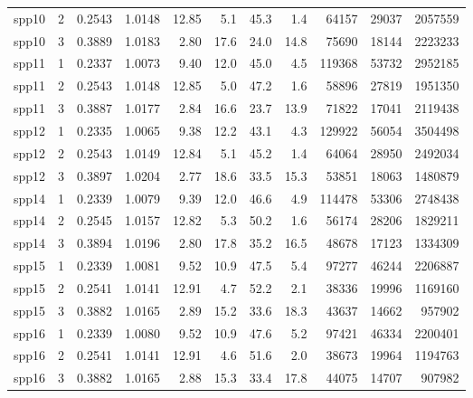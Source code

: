 \documentclass[12pt, a4paper]{article}
\begin{document}
\begin{longtable}{llrrrrrrrrr}
spp10 & 2 & 0.2543 & 1.0148 & 12.85 & 5.1 & 45.3 & 1.4 & 64157 & 29037 & 2057559 \\
spp10 & 3 & 0.3889 & 1.0183 & 2.80 & 17.6 & 24.0 & 14.8 & 75690 & 18144 & 2223233 \\
spp11 & 1 & 0.2337 & 1.0073 & 9.40 & 12.0 & 45.0 & 4.5 & 119368 & 53732 & 2952185 \\
spp11 & 2 & 0.2543 & 1.0148 & 12.85 & 5.0 & 47.2 & 1.6 & 58896 & 27819 & 1951350 \\
spp11 & 3 & 0.3887 & 1.0177 & 2.84 & 16.6 & 23.7 & 13.9 & 71822 & 17041 & 2119438 \\
spp12 & 1 & 0.2335 & 1.0065 & 9.38 & 12.2 & 43.1 & 4.3 & 129922 & 56054 & 3504498 \\
spp12 & 2 & 0.2543 & 1.0149 & 12.84 & 5.1 & 45.2 & 1.4 & 64064 & 28950 & 2492034 \\
spp12 & 3 & 0.3897 & 1.0204 & 2.77 & 18.6 & 33.5 & 15.3 & 53851 & 18063 & 1480879 \\
spp14 & 1 & 0.2339 & 1.0079 & 9.39 & 12.0 & 46.6 & 4.9 & 114478 & 53306 & 2748438 \\
spp14 & 2 & 0.2545 & 1.0157 & 12.82 & 5.3 & 50.2 & 1.6 & 56174 & 28206 & 1829211 \\
spp14 & 3 & 0.3894 & 1.0196 & 2.80 & 17.8 & 35.2 & 16.5 & 48678 & 17123 & 1334309 \\
spp15 & 1 & 0.2339 & 1.0081 & 9.52 & 10.9 & 47.5 & 5.4 & 97277 & 46244 & 2206887 \\
spp15 & 2 & 0.2541 & 1.0141 & 12.91 & 4.7 & 52.2 & 2.1 & 38336 & 19996 & 1169160 \\
spp15 & 3 & 0.3882 & 1.0165 & 2.89 & 15.2 & 33.6 & 18.3 & 43637 & 14662 & 957902 \\
spp16 & 1 & 0.2339 & 1.0080 & 9.52 & 10.9 & 47.6 & 5.2 & 97421 & 46334 & 2200401 \\
spp16 & 2 & 0.2541 & 1.0141 & 12.91 & 4.6 & 51.6 & 2.0 & 38673 & 19964 & 1194763 \\
spp16 & 3 & 0.3882 & 1.0165 & 2.88 & 15.3 & 33.4 & 17.8 & 44075 & 14707 & 907982 \\
\end{longtable}
\endgroup
\end{document}
